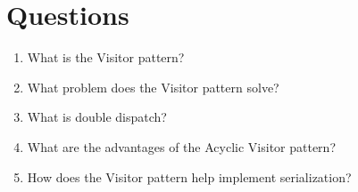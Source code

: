 \section{Questions}

\begin{enumerate}
\item
  What is the Visitor pattern?
\item
  What problem does the Visitor pattern solve?
\item
  What is double dispatch?
\item
  What are the advantages of the Acyclic Visitor pattern?
\item
  How does the Visitor pattern help implement serialization?
\end{enumerate}

